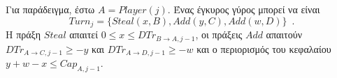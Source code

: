 Για παράδειγμα, έστω $A = Player(j)$. Ένας έγκυρος γύρος μπορεί να είναι
\begin{equation*}
  Turn_j = \{Steal\left(x, B\right), Add\left(y, C\right), Add\left(w, D\right)\} \enspace.
\end{equation*}
Η πράξη $Steal$ απαιτεί $0 \leq x \leq DTr_{B \rightarrow A, j-1}$, οι πράξεις $Add$ απαιτούν $DTr_{A \rightarrow C, j-1} \geq
-y$ και $DTr_{A \rightarrow D, j-1} \geq -w$ και ο περιορισμός του κεφαλαί\-ου $y + w - x \leq Cap_{A, j-1}$.

